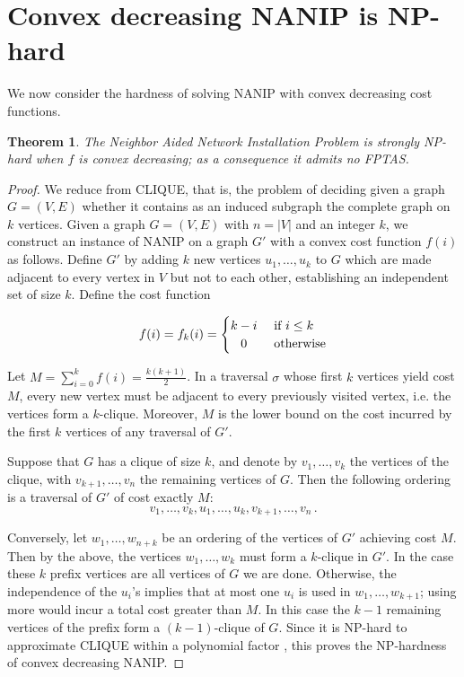 \documentclass[english]{llncs}
\newtheorem{thm}{Theorem}
\begin{document}
\section{Convex decreasing NANIP is NP-hard} \label{sec:computation} We now
consider the hardness of solving NANIP with convex decreasing cost functions.

\begin{thm} \label{thm:np-hard} The Neighbor Aided Network Installation Problem
is strongly NP-hard when $f$ is convex decreasing; as a consequence it admits
no FPTAS. \end{thm}

\begin{proof} 

We reduce from CLIQUE, that is, the problem of deciding given a graph $G =
(V,E)$ whether it contains as an induced subgraph the complete graph on $k$
vertices.  Given a graph $G = (V,E)$ with $n=|V|$ and an integer $k$, we
construct an instance of NANIP on a graph $G'$ with a convex cost function
$f(i)$ as follows.  Define $G'$ by adding $k$ new vertices $u_1, \dots, u_k$ to
$G$ which are made adjacent to every vertex in $V$ but not to each other, establishing
an independent set of size $k$.
Define the cost function 

\[
 f(i) = f_k(i) =
  \begin{cases} 
      \hfill k-i    \hfill & \text{ if $i \leq k$} \\
      \hfill 0          \hfill & \text{ otherwise} \\
  \end{cases}
\]


Let $M = \sum_{i=0}^{k} f(i)=\frac{k(k+1)}2$.  In a traversal $\sigma$ whose
first $k$ vertices yield cost $M$, every new vertex must be adjacent to every
previously visited vertex, i.e. the vertices form a $k$-clique.  Moreover, $M$
is the lower bound on the cost incurred by the first $k$ vertices of any
traversal of $G'$. 

Suppose that $G$ has a clique of size $k$, and denote by $v_1, \dots, v_k$ the
vertices of the clique, with $v_{k+1}, \dots, v_n$ the remaining vertices of
$G$. Then the following ordering is a traversal of $G'$ of cost exactly $M$:
\[
   v_1, \dots, v_k, u_1, \dots, u_k, v_{k+1}, \dots, v_n \,.
\]

Conversely, let $w_1, \dots, w_{n+k}$ be an ordering of the vertices of $G'$
achieving cost $M$.  Then by the above, the vertices $w_1, \dots, w_{k}$ must
form a $k$-clique in $G'$.  In the case these $k$ prefix vertices are all
vertices of $G$ we are done.  Otherwise, the independence of the $u_i$'s
implies that at most one $u_i$ is used in $w_1, \dots, w_{k+1}$; using more
would incur a total cost greater than $M$.  In this case the $k-1$ remaining
vertices of the prefix form a $(k-1)$-clique of $G$.
Since it is NP-hard to approximate CLIQUE within a polynomial factor
\cite{Zuckerman06}, this proves the NP-hardness of convex decreasing NANIP.


\end{proof}
\end{document}
